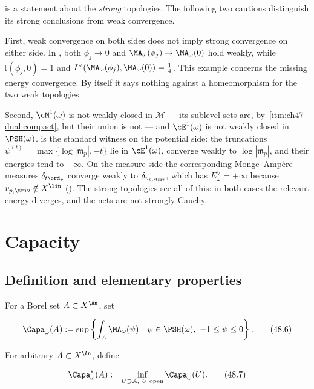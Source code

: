 \begin{remark}
\label{rem:ch48-not-weak}
 is a statement about the \emph{strong}
topologies. The following two cautions distinguish its strong conclusions
from weak convergence.

First, weak convergence on both sides does not imply strong convergence
on either side. In , both
$\phi_j\to0$ and $\MA_\omega(\phi_j)\to\MA_\omega(0)$ hold weakly, while
$\mathbb I(\phi_j,0)=1$ and
$I^\vee(\MA_\omega(\phi_j),\MA_\omega(0))=\tfrac14$.
This example concerns the missing energy convergence. By itself it says
nothing against a homeomorphism for the two weak topologies.

Second, $\cM^1(\omega)$ is not weakly closed in $\mathcal M$ --- its
sublevel sets are, by
\,\cref{itm:ch47-dual:compact}, but their
union is not --- and $\cE^1(\omega)$ is not weakly closed in
$\PSH(\omega)$.   is the standard
witness on the potential side: the truncations
$\psi^{(t)}=\max\{\log|\mathfrak m_p|,-t\}$ lie in
$\cE^1(\omega)$, converge weakly to $\log|\mathfrak m_p|$, and their
energies tend to $-\infty$.  On the measure side the corresponding
Monge--Amp\`ere measures $\delta_{t\ord_p}$ converge weakly to
$\delta_{v_{p,\triv}}$, which has $E^\vee_\omega=+\infty$ because
$v_{p,\triv}\notin X^{\lin}$ ().  The
strong topologies see all of this: in both cases the relevant energy
diverges, and the nets are not strongly Cauchy.
\end{remark}

\section{Capacity}
\label{sec:ch48-capacity}

\subsection{Definition and elementary properties}
\label{sec:ch48-capacity-def}

\begin{definition}[Capacity]
\label{def:bj-bt-capacity}
For a Borel set $A\subset X^{\An}$, set

\[
 \Capa_\omega(A):=
 \sup\left\{\int_A\MA_\omega(\psi)\ \middle|\
       \psi\in\PSH(\omega),\ -1\leq\psi\leq0\right\}.
\tag{48.6}\label{eq:bj-bt-capacity}
\]

For arbitrary $A\subset X^{\An}$, define

\[
 \Capa_\omega^*(A):=\inf_{U\supset A,\ U\text{ open}}\Capa_\omega(U).
\tag{48.7}\label{eq:bj-outer-capacity}
\]
\end{definition}

